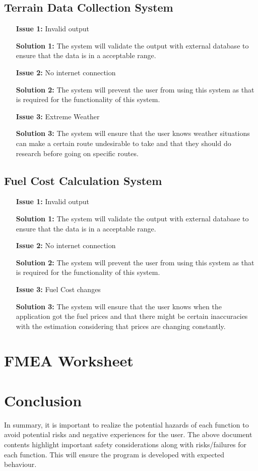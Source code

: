 \documentclass{article}
\begin{document}
\subsection{Terrain Data Collection System}
\begin{itemize}
	\item[\textbf{Issue 1:}] Invalid output
	\item[\textbf{Solution 1:}] The system will validate the output with external database to ensure that the data is in a acceptable range.
	\item[\textbf{Issue 2:}] No internet connection
	\item[\textbf{Solution 2:}] The system will prevent the user from using this system as that is required for the functionality of this system.
	\item[\textbf{Issue 3:}] Extreme Weather
	\item[\textbf{Solution 3:}] The system will ensure that the user knows weather situations can make a certain route undesirable to take and that they 
	should do research before going on specific routes.
\end{itemize}

\subsection{Fuel Cost Calculation System}
\begin{itemize}
	\item[\textbf{Issue 1:}] Invalid output
	\item[\textbf{Solution 1:}] The system will validate the output with external database to ensure that the data is in a acceptable range.
	\item[\textbf{Issue 2:}] No internet connection
	\item[\textbf{Solution 2:}] The system will prevent the user from using this system as that is required for the functionality of this system.
	\item[\textbf{Issue 3:}] Fuel Cost changes
	\item[\textbf{Solution 3:}] The system will ensure that the user knows when the application got the fuel prices and that there might be certain inaccuracies 
	with the estimation considering that prices are changing constantly.
\end{itemize}

\section{FMEA Worksheet}

\section{Conclusion}
In summary, it is important to realize the potential hazards of each function to avoid potential risks and negative experiences for the user. The above document contents highlight
important safety considerations along with risks/failures for each function. This will ensure
the program is developed with expected behaviour.
\end{document}
